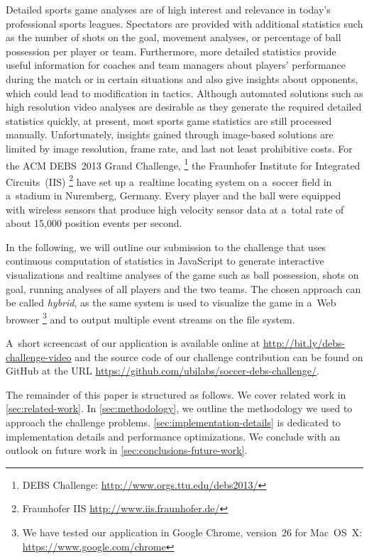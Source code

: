 \documentclass{sig-alternate}
\newcommand{\inlinelistingsize}{\fontsize{8pt}{11pt}}
\let\oldurl\url
\renewcommand{\url}[1]{\inlinelistingsize\oldurl{#1}}
\begin{document}
Detailed sports game analyses are of high interest and
relevance in today's professional sports leagues.
Spectators are provided with additional statistics
such as the number of shots on the goal, movement analyses,
or percentage of ball possession per player or team.
Furthermore, more detailed statistics provide useful information
for coaches and team managers about players' performance
during the match or in certain situations
and also give insights about opponents,
which could lead to modification in tactics.
Although automated solutions
such as high resolution video analyses are desirable
as they generate the required detailed statistics quickly,
at present, most sports game statistics are still processed manually.
Unfortunately, insights gained through image-based solutions
are limited by image resolution, frame rate, and last not least
prohibitive costs.
For the ACM DEBS~2013 Grand Challenge,%
\footnote{DEBS Challenge: \url{http://www.orgs.ttu.edu/debs2013/}}
the Fraunhofer Institute for Integrated Circuits~(IIS)%
\footnote{Fraunhofer IIS \url{http://www.iis.fraunhofer.de/}}
have set up a~realtime locating system on a~soccer field
in a~stadium in Nuremberg, Germany.
Every player and the ball were equipped with wireless sensors
that produce high velocity sensor data at a~total rate
of about 15,000 position events per second.

In the following, we will outline our submission to the challenge
that uses continuous computation of statistics in JavaScript
to generate interactive visualizations and realtime analyses
of the game such as ball possession, shots on goal,
running analyses of all players and the two teams.
The chosen approach can be called \emph{hybrid},
as the same system is used to visualize the game in a~Web browser%
\footnote{We have tested our application in Google Chrome, version~26 for Mac~OS~X: \url{https://www.google.com/chrome}}
and to output multiple event streams on the file system.

A~short screencast of our application is available online 
at \url{http://bit.ly/debs-challenge-video} and the source code
of our challenge contribution can be found on GitHub at
the URL \url{https://github.com/ubilabs/soccer-debs-challenge/}.

The remainder of this paper is structured as follows.
We cover related work in \autoref{sec:related-work}.
In \autoref{sec:methodology}, we outline
the methodology we used to approach the challenge problems.
\autoref{sec:implementation-details}
is dedicated to implementation details and performance optimizations.
We conclude with an outlook on future work in \autoref{sec:conclusions-future-work}.
\end{document}
